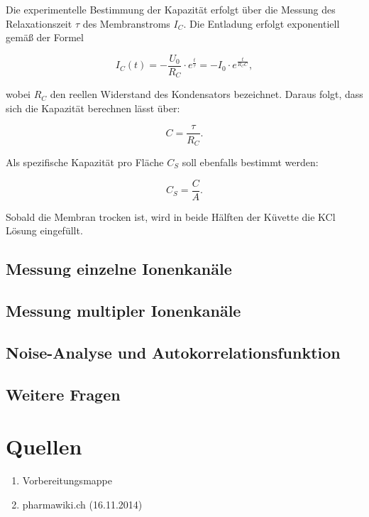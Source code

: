 \documentclass[a4paper,ngerman]{scrartcl}
\begin{document}
Die experimentelle Bestimmung der Kapazität erfolgt über die Messung des Relaxationszeit $\tau$ des Membranstroms $I_C$. Die Entladung erfolgt
exponentiell gemäß der Formel

\begin{equation}
  I_C(t) = - \frac{U_0}{R_C} \cdot e^{\frac{t}{\tau}} = - I_0 \cdot e^{\frac{t}{R_C C}},
\end{equation}

wobei $R_C$ den reellen Widerstand des Kondensators bezeichnet. 
Daraus folgt, dass sich die Kapazität berechnen lässt über:

\begin{equation}
  C = \frac{\tau}{R_C}.
\end{equation}

Als spezifische Kapazität pro Fläche $C_S$ soll ebenfalls bestimmt werden:

\begin{equation}
  C_S = \frac{C}{A}.
\end{equation}

Sobald die Membran trocken ist, wird in beide Hälften der Küvette die KCl Lösung eingefüllt.

\subsection{Messung einzelne Ionenkanäle}
\label{sec:singlechannels}

\subsection{Messung multipler Ionenkanäle}
\label{sec:multiplechannels}


\subsection{Noise-Analyse und Autokorrelationsfunktion}
\label{sec:noise-autocorr}

\subsection{Weitere Fragen}
\label{sec:weitere-fragen}















\section{Quellen}
\begin{enumerate}
\item Vorbereitungsmappe \label{ref:mappe}
\item pharmawiki.ch (16.11.2014) \label{ref:pharmawiki}
\end{enumerate}
\end{document}
